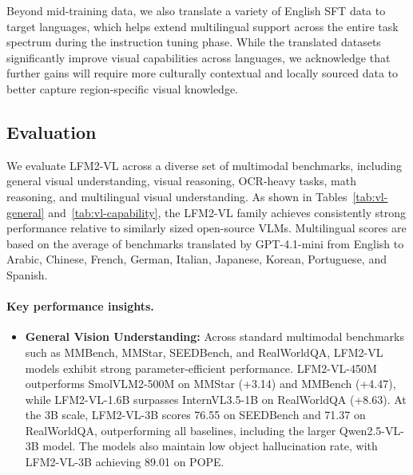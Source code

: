 \documentclass{article}
\begin{document}
Beyond mid-training data, we also translate a variety of English SFT data to target languages, which helps extend multilingual support across the entire task spectrum during the instruction tuning phase. While the translated datasets significantly improve visual capabilities across languages, we acknowledge that further gains will require more culturally contextual and locally sourced data to better capture region-specific visual knowledge.

\subsection{Evaluation}
\label{subsec:vlm-eval}

We evaluate LFM2-VL across a diverse set of multimodal benchmarks, including general visual understanding, visual reasoning, OCR-heavy tasks, math reasoning, and multilingual visual understanding. As shown in Tables~\ref{tab:vl-general} and~\ref{tab:vl-capability}, the LFM2-VL family achieves consistently strong performance relative to similarly sized open-source VLMs. Multilingual scores are based on the average of benchmarks translated by GPT-4.1-mini from English to Arabic, Chinese, French, German, Italian, Japanese, Korean, Portuguese, and Spanish.

\paragraph{Key performance insights.}
\begin{itemize}
    \item \textbf{General Vision Understanding:} Across standard multimodal benchmarks such as MMBench, MMStar, SEEDBench, and RealWorldQA, LFM2-VL models exhibit strong parameter-efficient performance. LFM2-VL-450M outperforms SmolVLM2-500M on MMStar (+3.14) and MMBench (+4.47), while LFM2-VL-1.6B surpasses InternVL3.5-1B on RealWorldQA (+8.63). At the 3B scale, LFM2-VL-3B scores 76.55 on SEEDBench and 71.37 on RealWorldQA, outperforming all baselines, including the larger Qwen2.5-VL-3B model. The models also maintain low object hallucination rate, with LFM2-VL-3B achieving 89.01 on POPE.
\end{itemize}
\end{document}
